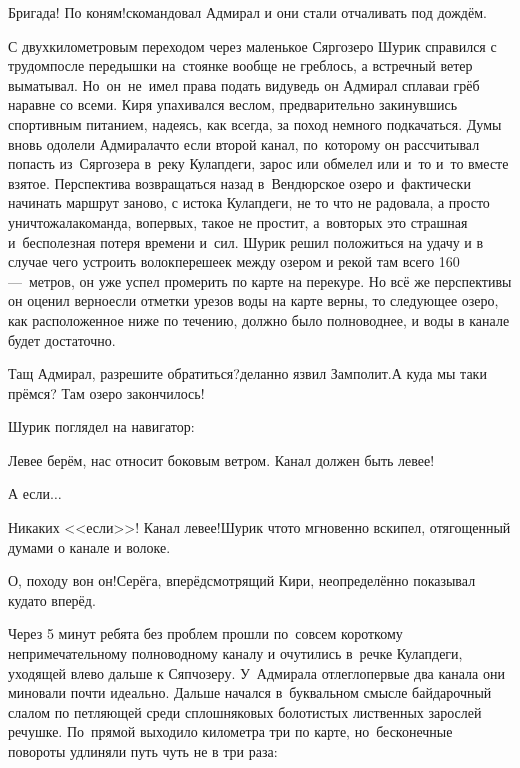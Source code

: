 \diagdash Бригада! По коням!\mdash скомандовал Адмирал и они стали отчаливать под дождём.

С двухкилометровым переходом через маленькое Сяргозеро Шурик справился с трудом\mdash после передышки на~стоянке вообще не греблось, а встречный ветер выматывал. Но~он~не~имел права подать виду\mdash ведь он Адмирал сплава\mdash и грёб наравне со всеми. Киря упахивался веслом, предварительно закинувшись спортивным питанием, надеясь, как всегда, за поход немного подкачаться. Думы вновь одолели Адмирала\mdash что если второй канал, по~которому он рассчитывал попасть из~Сяргозера в~реку Кулапдеги, зарос или обмелел или и~то и~то вместе взятое. Перспектива возвращаться назад в~Вендюрское озеро и~фактически начинать маршрут заново, с истока Кулапдеги, не то что не радовала, а просто уничтожала\mdash команда, во\sdash первых, такое не простит, а~во\sdash вторых это страшная и~бесполезная потеря времени и~сил. Шурик решил положиться на удачу и в случае чего устроить волок\mdash перешеек между озером и рекой там всего 160\thinspace\nobreakdash---~метров, он уже успел промерить по карте на перекуре. Но всё же перспективы он оценил верно\mdash если отметки урезов воды на карте верны, то следующее озеро, как расположенное ниже по течению, должно было полноводнее, и воды в канале будет достаточно.

\diagdash Тащ Адмирал, разрешите обратиться?\mdash деланно язвил Замполит.\mdash А куда мы таки прёмся? Там озеро закончилось!

Шурик поглядел на навигатор:

\diagdash Левее берём, нас относит боковым ветром. Канал должен быть левее!

\diagdash А если$\ldots$

\diagdash Никаких <<если>>! Канал левее!\mdash Шурик что\sdash то мгновенно вскипел, отягощенный думами о канале и волоке.

\diagdash О, походу вон он!\mdash Серёга, вперёдсмотрящий Кири, неопределённо показывал куда\sdash то вперёд.

Через 5 минут ребята без проблем прошли по~совсем короткому непримечательному полноводному каналу и очутились в~речке Кулапдеги, уходящей влево дальше к Сяпчозеру. У~Адмирала отлегло\mdash первые два канала они миновали почти идеально. Дальше начался в~буквальном смысле байдарочный слалом по петляющей среди сплошняковых болотистых лиственных зарослей речушке. По~прямой выходило километра три по карте, но~бесконечные повороты удлиняли путь чуть не в три раза:

